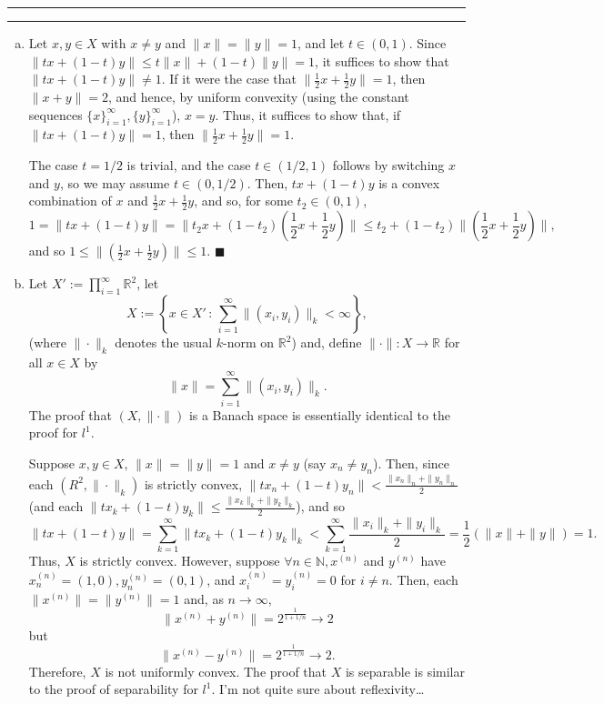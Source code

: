 \documentclass[11pt]{article}
\newcounter{questionCounter}
\newcounter{partCounter}[questionCounter]
\newenvironment{question}[2][\arabic{questionCounter}]{%
    \setcounter{partCounter}{0}%
    \vspace{.25in} \hrule \vspace{0.5em}%
        \noindent{\bf #2}%
    \vspace{0.8em} \hrule \vspace{.10in}%
    \addtocounter{questionCounter}{1}%
}{}
\renewcommand{\qed}{\quad $\blacksquare$}
\newcommand{\N}{\mathbb{N}} %
\newcommand{\R}{\mathbb{R}} %
\begin{document}
\begin{question}{Problem 9}
\begin{enumerate}[(a)]
\item
Let $x,y \in X$ with $x \neq y$ and $\|x\| = \|y\| = 1$, and let $t \in (0,1)$.
Since $\|tx + (1 - t)y\| \leq t\|x\| + (1 - t)\|y\| = 1$, it suffices to show
that $\|tx + (1 - t)y\| \neq 1$. If it were the case that
$\|\frac12x + \frac12y\| = 1$, then $\|x + y\| = 2$, and hence, by uniform
convexity (using the constant sequences
$\{x\}_{i = 1}^\infty, \{y\}_{i = 1}^\infty$), $x = y$. Thus, it suffices to
show that, if $\|tx + (1 - t)y\| = 1$, then $\|\frac12x + \frac12y\| = 1$.

The case $t = 1/2$ is trivial, and the case $t \in (1/2,1)$ follows by
switching $x$ and $y$, so we may assume $t \in (0,1/2)$.
Then, $tx + (1 - t)y$ is a convex combination of $x$ and $\frac12x + \frac12y$,
and so, for some $t_2 \in (0,1)$,
\[1
    = \|tx + (1 - t)y\|
    = \|t_2x + (1 - t_2)(\frac12x + \frac12y)\|
    \leq t_2 + (1 - t_2)\|(\frac12x + \frac12y)\|,
\]
and so $1 \leq \|(\frac12x + \frac12y)\| \leq 1$. \qed

\item Let $\displaystyle X' := \prod_{i = 1}^\infty \R^2$,
let
\vspace{-0.2in}
\[X := \left\{ x \in X'
        \, : \, \sum_{i = 1}^\infty \|(x_i,y_i)\|_k < \infty \right\},\]
(where $\|\cdot\|_k$ denotes the usual $k$-norm on $\R^2$) and, define
$\|\cdot\| : X \to \R$ for all $x \in X$ by
\[\|x\| = \sum_{i = 1}^\infty \|(x_i,y_i)\|_k.\]
The proof that $(X,\|\cdot\|)$ is a Banach space is essentially identical to
the proof for $l^1$.

Suppose $x, y \in X$, $\|x\| = \|y\| = 1$ and $x \neq y$ (say $x_n \neq y_n$).
Then, since each $(R^2,\|\cdot\|_k)$ is strictly convex,
$\|tx_n + (1 - t)y_n\| < \frac{\|x_n\|_n + \|y_n\|_n}{2}$ (and each
$\|tx_k + (1 - t)y_k\| \leq \frac{\|x_k\|_k + \|y_k\|_k}{2}$), and so 
\[\|tx + (1 - t)y\|
    = \sum_{k = 1}^\infty \|tx_k + (1 - t)y_k\|_k
    < \sum_{k = 1}^\infty \frac{\|x_i\|_k + \|y_i\|_k}{2}
    = \frac12(\|x\| + \|y\|)
    = 1.
\]
Thus, $X$ is strictly convex. However, suppose
$\forall n \in \N, x^{(n)}$ and $y^{(n)}$ have $x^{(n)}_n = (1,0),
y^{(n)}_n = (0,1)$, and $x^{(n)}_i = y^{(n)}_i = 0$ for $i \neq n$. Then, each
$\|x^{(n)}\| = \|y^{(n)}\| = 1$ and, as $n \to \infty$,
\[\|x^{(n)} + y^{(n)}\| = 2^{\frac{1}{1 + 1/n}} \to 2\]
but
\[\|x^{(n)} - y^{(n)}\| = 2^{\frac{1}{1 + 1/n}} \to 2.\]
Therefore, $X$ is not uniformly convex. The proof that $X$ is separable is
similar to the proof of separability for $l^1$. I'm not quite sure about
reflexivity\dots
\end{enumerate}
\end{question}
\end{document}
